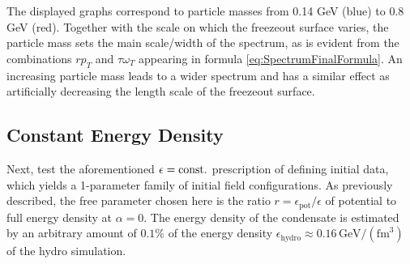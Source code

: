 The displayed graphs correspond to particle masses from 0.14 GeV (blue) to 0.8 GeV (red). Together with the scale on which the freezeout surface varies, the particle mass sets the main scale/width of the spectrum, as is evident from the combinations ${rp_T}$ and ${\tau\omega_T}$ appearing in formula \eqref{eq:SpectrumFinalFormula}. An increasing particle mass leads to a wider spectrum and has a similar effect as artificially decreasing the length scale of the freezeout surface.

\subsection{Constant Energy Density}

Next, test the aforementioned $\epsilon={\text{const.}}$ prescription of defining initial data, which yields a 1-parameter family of initial field configurations. As previously described, the free parameter chosen here is the ratio ${r=\epsilon_{\text{pot}}/\epsilon}$ of potential to full energy density at ${\alpha=0}$. The energy density of the condensate is estimated by an arbitrary amount of $0.1\%$ of the energy density ${\epsilon_{\text{hydro}}\approx 0.16\,\mathrm{GeV}/(\mathrm{fm}^3)}$ of the hydro simulation.\\
